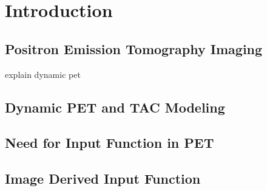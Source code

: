 \chapter{Introduction}

\section{Positron Emission Tomography Imaging}
explain dynamic pet
\cite{Faulkes2013}

\lipsum[1-1]
\section{Dynamic PET and TAC Modeling}
\lipsum[1-1]
\section{Need for Input Function in PET}
\lipsum[1-1]

\section{Image Derived Input Function}
\lipsum[1-1]

